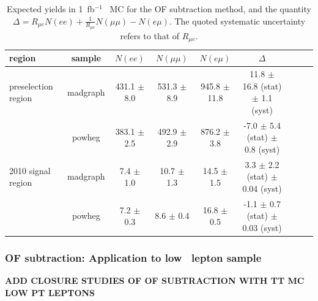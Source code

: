 \begin{table}[hbt]
\begin{center}
\caption{\label{tab:mcof} Expected yields in 1~fb$^{-1}$ \ttbar\ MC for the OF subtraction method,
and the quantity 
$\Delta = R_{\mu e}N(ee) + \frac{1}{R_{\mu e}}N(\mu\mu) - N(e\mu)$. 
The quoted systematic uncertainty refers to that of $R_{\mu e}$.
}
\begin{tabular}{lcccccccc}
\hline
region                  &     sample  &       $N(ee)$     &      $N(\mu\mu)$   &     $N(e\mu)$      &         $\Delta$   \\ 
\hline

\hline

preselection region     &   madgraph  & 431.1 $\pm$ 8.0   &  531.3 $\pm$ 8.9   &  945.8 $\pm$ 11.8  &  11.8 $\pm$ 16.8 (stat) $\pm$ 1.1 (syst)   \\
                        &   powheg    & 383.1 $\pm$ 2.5   &  492.9 $\pm$ 2.9   &  876.2 $\pm$ 3.8   &  -7.0 $\pm$  5.4 (stat) $\pm$ 0.8 (syst)   \\

\hline

2010 signal region      &   madgraph  &   7.4 $\pm$ 1.0   &   10.7 $\pm$ 1.3   &   14.5 $\pm$ 1.5   &   3.3 $\pm$  2.2 (stat) $\pm$  0.04 (syst) \\
                        &   powheg    &   7.2 $\pm$ 0.3   &    8.6 $\pm$ 0.4   &   16.8 $\pm$ 0.5   &  -1.1 $\pm$  0.7 (stat) $\pm$  0.03 (syst) \\

\hline

\hline
\end{tabular}
\end{center}
\end{table}

\subsubsection{OF subtraction: Application to low \pt\ lepton sample}

{\bf ADD CLOSURE STUDIES OF OF SUBTRACTION WITH TT MC LOW PT LEPTONS }

